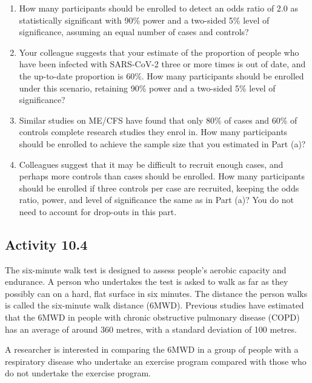 \documentclass[
  a4paper,
]{memoir}
\providecommand{\tightlist}{%
  \setlength{\itemsep}{0pt}\setlength{\parskip}{0pt}}
\begin{document}
\begin{enumerate}
\def\labelenumi{\alph{enumi})}
\tightlist
\item
  How many participants should be enrolled to detect an odds ratio of
  2.0 as statistically significant with 90\% power and a two-sided 5\%
  level of significance, assuming an equal number of cases and controls?
\item
  Your colleague suggests that your estimate of the proportion of people
  who have been infected with SARS-CoV-2 three or more times is out of
  date, and the up-to-date proportion is 60\%. How many participants
  should be enrolled under this scenario, retaining 90\% power and a
  two-sided 5\% level of significance?
\item
  Similar studies on ME/CFS have found that only 80\% of cases and 60\%
  of controls complete research studies they enrol in. How many
  participants should be enrolled to achieve the sample size that you
  estimated in Part (a)?
\item
  Colleagues suggest that it may be difficult to recruit enough cases,
  and perhaps more controls than cases should be enrolled. How many
  participants should be enrolled if three controls per case are
  recruited, keeping the odds ratio, power, and level of significance
  the same as in Part (a)? You do not need to account for drop-outs in
  this part.
\end{enumerate}

\subsection*{Activity 10.4}\label{activity-10.4}

The six-minute walk test is designed to assess people's aerobic capacity
and endurance. A person who undertakes the test is asked to walk as far
as they possibly can on a hard, flat surface in six minutes. The
distance the person walks is called the six-minute walk distance (6MWD).
Previous studies have estimated that the 6MWD in people with chronic
obstructive pulmonary disease (COPD) has an average of around 360
metres, with a standard deviation of 100 metres.

A researcher is interested in comparing the 6MWD in a group of people
with a respiratory disease who undertake an exercise program compared
with those who do not undertake the exercise program.
\end{document}
